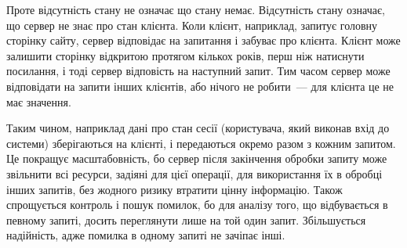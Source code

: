 Проте відсутність стану не означає що стану немає. Відсутність стану означає, що сервер не знає про стан клієнта. Коли клієнт, наприклад, запитує головну сторінку сайту, сервер відповідає на запитання і забуває про клієнта. Клієнт може залишити сторінку відкритою протягом кількох років, перш ніж натиснути посилання, і тоді сервер відповість на наступний запит. Тим часом сервер може відповідати на запити інших клієнтів, або нічого не робити~--- для клієнта це не має значення.

Таким чином, наприклад дані про стан сесії (користувача, який виконав вхід до системи) зберігаються на клієнті, і передаються окремо разом з кожним запитом. Це покращує масштабовність, бо сервер після закінчення обробки запиту може звільнити всі ресурси, задіяні для цієї операції, для використання їх в обробці інших запитів, без жодного ризику втратити цінну інформацію. Також спрощується контроль і пошук помилок, бо для аналізу того, що відбувається в певному запиті, досить переглянути лише на той один запит. Збільшується надійність, адже помилка в одному запиті не зачіпає інші.

